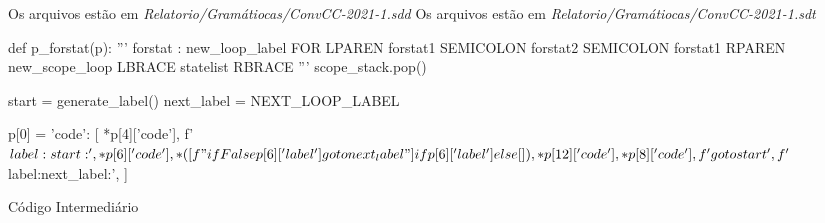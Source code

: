 \documentclass[
	12pt,				%
	openright,			%
	twoside,			%
	a4paper,			%
	english,			%
	french,				%
	spanish,			%
	brazil				%
	]{abntex2}
\begin{document}
Os arquivos estão em \emph{Relatorio/Gramátiocas/ConvCC-2021-1.sdd}
Os arquivos estão em \emph{Relatorio/Gramátiocas/ConvCC-2021-1.sdt}

\begin{python}
def p_forstat(p):
    '''
    forstat : new_loop_label FOR LPAREN forstat1 SEMICOLON forstat2 SEMICOLON forstat1 RPAREN new_scope_loop LBRACE statelist RBRACE
    '''
    scope_stack.pop()

    start = generate_label()
    next_label = NEXT_LOOP_LABEL

    p[0] = {
        'code': [
            *p[4]['code'],
            f'$label:{start}:',
            *p[6]['code'],
            *([f"if False {p[6]['label']} goto {next_label}"] if p[6]['label'] else []),
            *p[12]['code'],
            *p[8]['code'],
            f'goto {start}',
            f'$label:{next_label}:',
        ]
}
\end{python}
Código Intermediário
\end{document}
